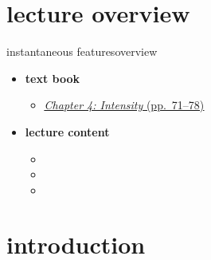 

\subtitle{Part 4.3: Feature Post-Processing}


	

    \section[overview]{lecture overview}
        \begin{frame}{instantaneous features}{overview}
            \begin{itemize}
                \item   \textbf{text book}  
                    \begin{itemize}
                        \item   \href{http://ieeexplore.ieee.org/xpl/articleDetails.jsp?tp=&arnumber=6331121&}{\underline{\textit{Chapter 4: Intensity} (pp.~71--78)}}
                    \end{itemize}
                \bigskip
                \item<2->   \textbf{lecture content}
                    \begin{itemize}
                        \item<2->   
                        \item<3->   
                        \item<4->   
                    \end{itemize}
            \end{itemize}
        \end{frame}

    \section[intro]{introduction}

